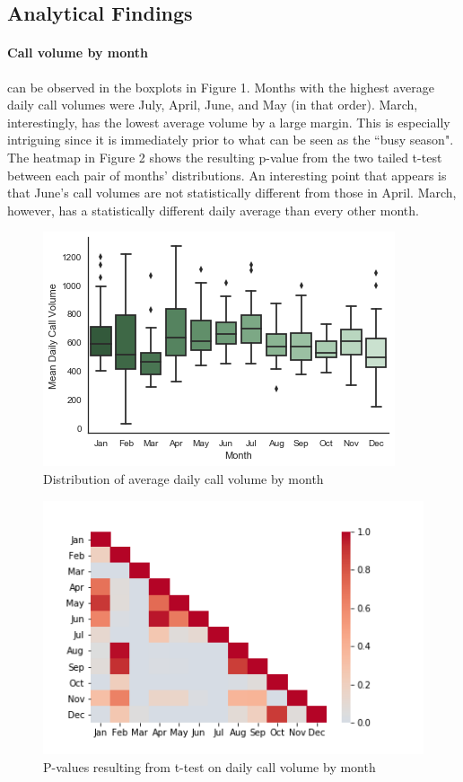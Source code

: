 \documentclass[12pt]{article}
\begin{document}
	\subsection{Analytical Findings}

\paragraph{Call volume by month} can be observed in the boxplots in Figure 1.  Months with the highest average daily call volumes were July, April, June, and May (in that order).  March, interestingly, has the lowest average volume by a large margin.  This is especially intriguing since it is immediately prior to what can be seen as the “busy season".  The heatmap in Figure 2 shows the resulting p-value from the two tailed t-test between each pair of months' distributions.  An interesting point that appears is that June's call volumes are not statistically different from those in April.  March, however, has a statistically different daily average than every other month.


	\begin{figure}
	\includegraphics[scale=.4]{monthly_boxplot.png}
	\caption{Distribution of average daily call volume by month}
	\end{figure}

	\begin{figure}
	\includegraphics[scale=.4]{Heatmap.png}
	\caption{P-values resulting from t-test on daily call volume by month}
	\end{figure}
\end{document}
